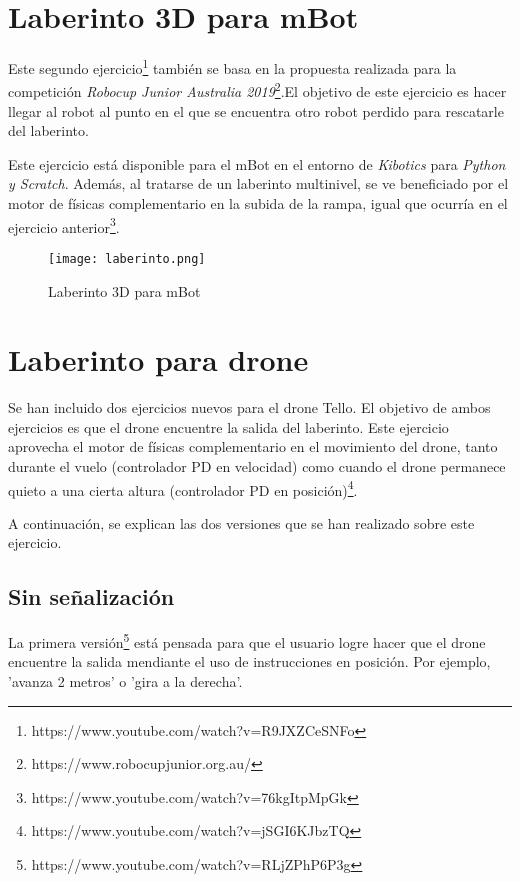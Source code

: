 \section{Laberinto 3D para mBot}
Este segundo ejercicio\footnote{https://www.youtube.com/watch?v=R9JXZCeSNFo} también se basa en la propuesta realizada para la competición \textit{Robocup Junior Australia 2019}\footnote{https://www.robocupjunior.org.au/}.El objetivo de este ejercicio es hacer llegar al robot al punto en el que se encuentra otro robot perdido para rescatarle del laberinto. \newline

Este ejercicio está disponible para el mBot en el entorno de \textit{Kibotics} para \textit{Python y Scratch}. Además, al tratarse de un laberinto multinivel, se ve beneficiado por el motor de físicas complementario en la subida de la rampa, igual que ocurría en el ejercicio anterior\footnote{https://www.youtube.com/watch?v=76kgItpMpGk}.

\begin{figure}[h!]
    \centering
    \texttt{[image: laberinto.png]}
    \caption{Laberinto 3D para mBot}
    \label{fig:Laberinto 3D para mBot}
\end{figure}


\section{Laberinto para drone}
Se han incluido dos ejercicios nuevos para el drone Tello. El objetivo de ambos ejercicios es que el drone encuentre la salida del laberinto. Este ejercicio aprovecha el motor de físicas complementario en el movimiento del drone, tanto durante el vuelo (controlador PD en velocidad) como cuando el drone permanece quieto a una cierta altura (controlador PD en posición)\footnote{https://www.youtube.com/watch?v=jSGI6KJbzTQ}. \newline

A continuación, se explican las dos versiones que se han realizado sobre este ejercicio.

\subsection{Sin señalización}
La primera versión\footnote{https://www.youtube.com/watch?v=RLjZPhP6P3g} está pensada para que el usuario logre hacer que el drone encuentre la salida mendiante el uso de instrucciones en posición. Por ejemplo, 'avanza 2 metros' o 'gira a la derecha'.

